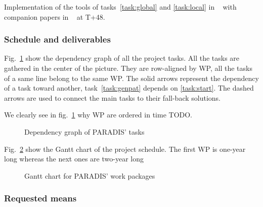\Success
  Implementation of the tools of tasks~\ref{task:global} and \ref{task:local}
    in \DGtalTools~ with companion papers in \IPOL~ at T+48.

    

\subsubsection{Schedule and deliverables}
\label{sec:schedule}

Fig.~\ref{fig:tasks} show the dependency graph of all the project tasks.
All the tasks are gathered in the center of the picture. They are row-aligned by WP,
\ie all the tasks of a same line belong to the same WP. 
The solid arrows represent the dependency of a task toward another,
\eg task~\ref{task:genpat} depends on \ref{task:start}. 
The dashed arrows are used to connect the main tasks to their fall-back solutions. 

We clearly see in fig.~\ref{fig:tasks} why WP are ordered in time TODO.

\begin{figure}[htbp]
  \centering
  
  \caption{Dependency graph of PARADIS' tasks}
  \label{fig:tasks}
\end{figure}


Fig.~\ref{fig:gantt} show the Gantt chart of the project schedule.
The first WP is one-year long whereas the next ones are two-year long

\begin{figure}[htbp]
  \centering
  
  \caption{Gantt chart for PARADIS' work packages}
  \label{fig:gantt}
\end{figure}



\subsubsection{Requested means}
\label{sec:ressources}


